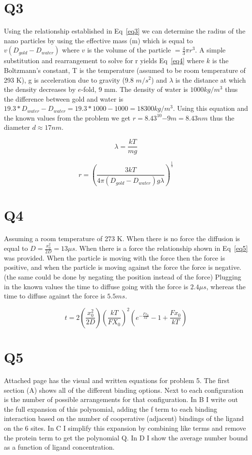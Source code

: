 \documentclass[12pt]{article}
\begin{document}
\section{Q3}
Using the relationship established in Eq~\ref{eq3} we can determine the radius of the nano particles by using the effective mass (m) which is equal to $v(D_{gold}-D_{water})$ where $v$ is the volume of the particle $ = \frac{4}{3}\pi r^3$. A simple substitution and rearrangement to solve for r yields Eq~\ref{eq4} where $k$ is the Boltzmann's constant, T is the temperature (assumed to be room temperature of 293 K), g is acceleration due to gravity (9.8 $m/s^2$) and $\lambda$ is the distance at which the density decreases by $e$-fold, 9 mm. The density of water is $1000 kg/m^3$ thus the difference between gold and water is $19.3*D_{water} - D_{water} = 19.3*1000 - 1000 = 18300 kg/m^3$. Using this equation and the known values from the problem we get $r = 8.43^10{-9} m = 8.43 nm$ thus the diameter $d \approx 17 nm$.

\begin{equation}
\lambda = \frac{kT}{mg}
\label{eq3}
\end{equation}

\begin{equation}
r = (\frac{3kT}{4\pi(D_{gold}-D_{water})g\lambda})^{\frac{1}{3}}
\label{eq4}
\end{equation}

\section{Q4}
Assuming a room temperature of 273 K. When there is no force the diffusion is equal to $D = \frac{x^2_0}{2D} = 13 \mu s$. When there is a force the relationship shown in Eq~\ref{eq5} was provided. When the particle is moving with the force then the force is positive, and when the particle is moving against the force the force is negative. (the same could be done by negating the position instead of the force) Plugging in the known values the time to diffuse going with the force is $2.4 \mu s$, whereas the time to diffuse against the force is $5.5 ms$.

\begin{equation}
t = 2(\frac{x^2_0}{2D})(\frac{kT}{FX_0})^2(e^{-\frac{Fx_0}{kT}}-1+\frac{Fx_0}{kT})
\label{eq5}
\end{equation}

\section{Q5}
Attached page has the visual and written equations for problem 5. The first section (A) shows all of the different binding options. Next to each configuration is the number of possible arrangements for that configuration. In B I write out the full expansion of this polynomial, adding the f term to each binding interaction based on the number of cooperative (adjacent) bindings of the ligand on the 6 sites. In C I simplify this expansion by combining like terms and remove the protein term to get the polynomial Q. In D I show the average number bound as a function of ligand concentration.
\end{document}
